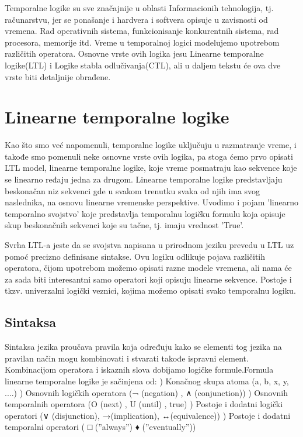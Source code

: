 \documentclass[a4paper]{article}
\begin{document}
{	Temporalne logike su sve značajnije u oblasti Informacionih tehnologija, tj. računarstvu, jer se ponašanje i hardvera i softvera opisuje u zavisnosti od vremena. Rad operativnih sistema, funkcionisanje konkurentnih sistema, rad procesora, memorije itd. Vreme u temporalnoj logici modelujemo upotrebom različitih operatora. Osnovne vrste ovih logika jesu Linearne temporalne logike(LTL) i Logike stabla odlučivanja(CTL), ali u daljem tekstu će ova dve vrste biti detaljnije obrađene.

	\section{Linearne temporalne logike}
	\label{sec:LTL}

	\newline
	Kao što smo već napomenuli, temporalne logike uključuju u razmatranje  vreme, i takođe smo pomenuli neke osnovne vrste ovih logika, pa stoga ćemo prvo opisati LTL model, linearne temporalne logike, koje vreme posmatraju kao sekvence koje se linearno ređaju jedna za drugom. Linearne temporalne logike predstavljaju beskonačan niz sekvenci gde u svakom trenutku svaka od njih ima svog naslednika, na osnovu linearne vremenske perspektive. Uvodimo i pojam 'linearno temporalno svojstvo' koje predstavlja temporalnu logičku formulu koja opisuje skup beskonačnih sekvenci koje su tačne, tj. imaju vrednost 'True'.\newline

	Svrha LTL-a jeste da se svojstva napisana u prirodnom jeziku prevedu u LTL uz pomoć precizno definisane sintakse. Ovu logiku odlikuje pojava različitih operatora, čijom upotrebom možemo opisati razne modele vremena, ali nama će za sada biti interesantni samo operatori koji opisuju linearne sekvence. Postoje i tkzv. univerzalni logički veznici, kojima možemo opisati svako temporalnu logiku.
	\subsection{Sintaksa}
	\label{subsec:podnaslovN}
	\newline
	
Sintaksa jezika proučava pravila koja određuju kako se elementi tog jezika na pravilan način mogu kombinovati i stvarati takođe ispravni element. Kombinacijom operatora i iskaznih slova dobijamo logičke formule.\newline\newline Formula linearne temporalne logike je sačinjena od: \newline {}) Konačnog skupa atoma (a, b, x, y, ....) ) Osnovnih logičkih operatora (¬ (negation) , ∧ (conjunction)) ) Osnovnih temporalnih operatora (O (next) , U (until) , true) ) Postoje i dodatni logički operatori (∨ (disjunction), →(implication), ↔(equivalence)) ) Postoje i dodatni temporalni operatori ( □ (”always”) ♦ (”eventually”)) \newline

}
\end{document}
